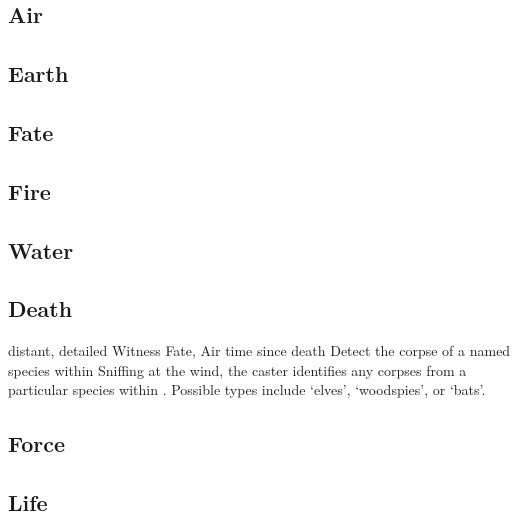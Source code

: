 \begin{multicols}{2}

\subsection{Air}


\subsection{Earth}


\subsection{Fate}


\subsection{Fire}

\subsection{Water}


\subsection{Death}


  {distant, detailed}%
  {Witness}%
  {Fate, Air}%
  {time since death}%
  {Detect the corpse of a named species within \spellRange}%
  {
    Sniffing at the wind, the caster identifies any corpses from a particular species within \spellRange.
    Possible types include `elves', `woodspies', or `bats'.
  }

\subsection{Force}


\subsection{Life}


\end{multicols}

